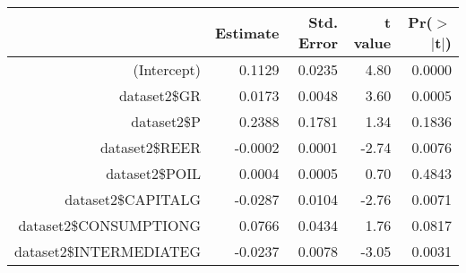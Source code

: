 \begin{table}[ht]
\centering
\begin{tabular}{rrrrr}
  \hline
 & Estimate & Std. Error & t value & Pr($>$$|$t$|$) \\ 
  \hline
(Intercept) & 0.1129 & 0.0235 & 4.80 & 0.0000 \\ 
  dataset2\$GR & 0.0173 & 0.0048 & 3.60 & 0.0005 \\ 
  dataset2\$P & 0.2388 & 0.1781 & 1.34 & 0.1836 \\ 
  dataset2\$REER & -0.0002 & 0.0001 & -2.74 & 0.0076 \\ 
  dataset2\$POIL & 0.0004 & 0.0005 & 0.70 & 0.4843 \\ 
  dataset2\$CAPITALG & -0.0287 & 0.0104 & -2.76 & 0.0071 \\ 
  dataset2\$CONSUMPTIONG & 0.0766 & 0.0434 & 1.76 & 0.0817 \\ 
  dataset2\$INTERMEDIATEG & -0.0237 & 0.0078 & -3.05 & 0.0031 \\ 
   \hline
\end{tabular}
\end{table}
